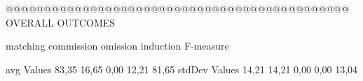 @@@@@@@@@@@@@@@@@@@@@@@@@@@@@@@@@@@@@@@@@@@@@ OVERALL OUTCOMES

               matching commission   omission  induction  F-measure
               
avg Values      83,35       16,65       0,00      12,21     81,65        
stdDev Values    14,21       14,21       0,00      0,00      13,04        